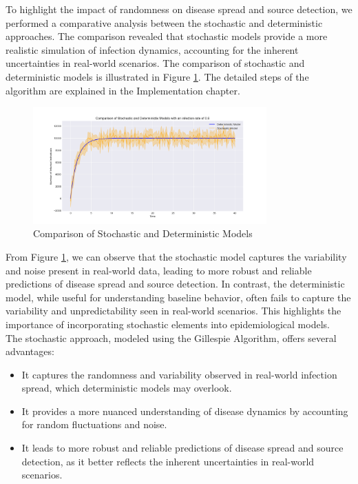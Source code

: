 To highlight the impact of randomness on disease spread and source detection, we performed a comparative analysis between the stochastic and deterministic approaches. The comparison revealed that stochastic models provide a more realistic simulation of infection dynamics, accounting for the inherent uncertainties in real-world scenarios. The comparison of stochastic and deterministic models is illustrated in Figure \ref{fig:stochastic_vs_deterministic}. The detailed steps of the algorithm are explained in the Implementation chapter.

\begin{figure}[H]
    \centering
    \includegraphics[width=0.8\textwidth]{stochastic_vs_deterministic.png}
    \caption{Comparison of Stochastic and Deterministic Models}
    \label{fig:stochastic_vs_deterministic}
\end{figure}

From Figure \ref{fig:stochastic_vs_deterministic}, we can observe that the stochastic model captures the variability and noise present in real-world data, leading to more robust and reliable predictions of disease spread and source detection. In contrast, the deterministic model, while useful for understanding baseline behavior, often fails to capture the variability and unpredictability seen in real-world scenarios. This highlights the importance of incorporating stochastic elements into epidemiological models.\\

The stochastic approach, modeled using the Gillespie Algorithm, offers several advantages:

\begin{itemize}
    \item It captures the randomness and variability observed in real-world infection spread, which deterministic models may overlook.
    \item It provides a more nuanced understanding of disease dynamics by accounting for random fluctuations and noise.
    \item It leads to more robust and reliable predictions of disease spread and source detection, as it better reflects the inherent uncertainties in real-world scenarios.
\end{itemize}

